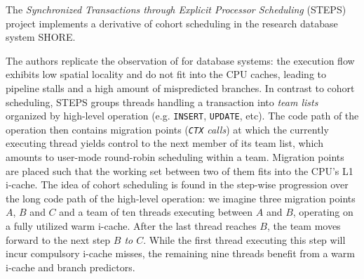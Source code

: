 \documentclass[12pt,a4paper]{book}
\begin{document}
The \emph{Synchronized Transactions through Explicit Processor Scheduling} (STEPS) project implements a derivative of cohort scheduling in the research database system SHORE.~\cite{shore}

The authors replicate the observation of \cite{cohort} for database systems: the execution flow exhibits low spatial locality and do not fit into the CPU caches, leading to pipeline stalls and a high amount of mispredicted branches.
In contrast to cohort scheduling, STEPS groups threads handling a transaction into \emph{team lists} organized by high-level operation (e.g. \texttt{INSERT}, \texttt{UPDATE}, etc).
The code path of the operation then contains migration points (\textit{\texttt{CTX} calls}) at which the currently executing thread yields control to the next member of its team list, which amounts to user-mode round-robin scheduling within a team.
Migration points are placed such that the working set between two of them fits into the CPU's L1 i-cache.
The idea of cohort scheduling is found in the step-wise progression over the long code path of the high-level operation:
we imagine three migration points $A$, $B$ and $C$ and a team of ten threads executing between $A$ and $B$, operating on a fully utilized warm i-cache.
After the last thread reaches $B$, the team moves forward to the next step  \textit{$B$ to $C$}.
While the first thread executing this step will incur compulsory  i-cache misses, the remaining nine threads benefit from a warm i-cache and branch predictors.
\end{document}
